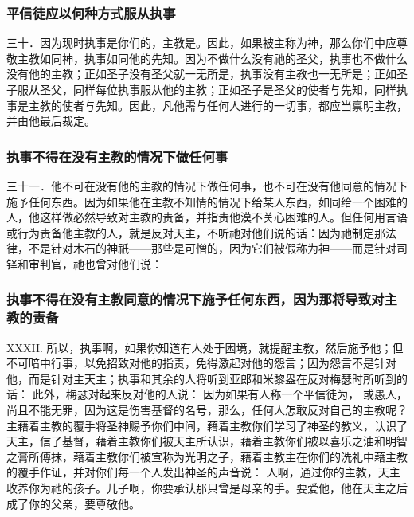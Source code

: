 
\subsubsection{平信徒应以何种方式服从执事}

三十．因为现时执事是你们的，主教是。因此，如果被主称为神，那么你们中应尊敬主教如同神，执事如同他的先知。因为不做什么没有祂的圣父，执事也不做什么没有他的主教；正如圣子没有圣父就一无所是，执事没有主教也一无所是；正如圣子服从圣父，同样每位执事服从他的主教；正如圣子是圣父的使者与先知，同样执事是主教的使者与先知。因此，凡他需与任何人进行的一切事，都应当禀明主教，并由他最后裁定。\par


\subsubsection{执事不得在没有主教的情况下做任何事}

三十一．他不可在没有他的主教的情况下做任何事，也不可在没有他同意的情况下施予任何东西。因为如果他在主教不知情的情况下给某人东西，如同给一个困难的人，他这样做必然导致对主教的责备，并指责他漠不关心困难的人。但任何用言语或行为责备他主教的人，就是反对天主，不听祂对他们说的话：因为祂制定那法律，不是针对木石的神祇——那些是可憎的，因为它们被假称为神——而是针对司铎和审判官，祂也曾对他们说：\par


\subsubsection{执事不得在没有主教同意的情况下施予任何东西，因为那将导致对主教的责备}

XXXII. 所以，执事啊，如果你知道有人处于困境，就提醒主教，然后施予他；但不可暗中行事，以免招致对他的指责，免得激起对他的怨言；因为怨言不是针对他，而是针对主天主；执事和其余的人将听到亚郎和米黎盎在反对梅瑟时所听到的话：  此外，梅瑟对起来反对他的人说：  因为如果有人称一个平信徒为， 或愚人，尚且不能无罪，因为这是伤害基督的名号，那么，任何人怎敢反对自己的主教呢？主藉着主教的覆手将圣神赐予你们中间，藉着主教你们学习了神圣的教义，认识了天主，信了基督，藉着主教你们被天主所认识，藉着主教你们被以喜乐之油和明智之膏所傅抹，藉着主教你们被宣称为光明之子，藉着主教主在你们的洗礼中藉主教的覆手作证，并对你们每一个人发出神圣的声音说： 人啊，通过你的主教，天主收养你为祂的孩子。儿子啊，你要承认那只曾是母亲的手。要爱他，他在天主之后成了你的父亲，要尊敬他。\par

